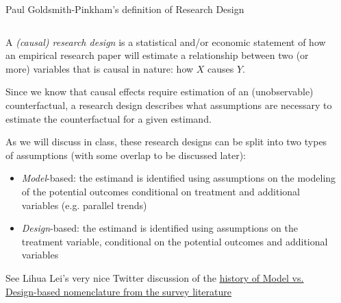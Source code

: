 \documentclass[notes,11pt, aspectratio=169]{beamer}
\newenvironment{wideitemize}{\itemize\addtolength{\itemsep}{10pt}}{\enditemize}
\begin{document}
\begin{frame}{Paul Goldsmith-Pinkham's definition of Research Design}
\begin{columns}[T] %
  \begin{column}{\textwidth}
    \begin{wideitemize}
    \item A \emph{(causal) research design} is a statistical and/or economic
      statement of how an empirical research paper will estimate a
      relationship between two (or more) variables that is causal in nature: how $X$ causes $Y$.

    \item Since we know that causal effects require estimation of an
      (unobservable) counterfactual, a research design describes what
      assumptions are necessary to estimate the counterfactual for a
      given estimand.
      
    \item As we will discuss in class, these research designs can be
      split into two types of assumptions (with some overlap to be
      discussed later):
      \begin{itemize}
      \item \emph{Model}-based: the estimand is
        identified using assumptions on the modeling of the potential outcomes conditional on treatment and additional variables
         (e.g. parallel trends)
       \item\emph{Design}-based: the estimand is
         identified using assumptions on the treatment variable,
         conditional on the potential outcomes and additional
         variables
      \end{itemize}

    \item See Lihua Lei's very nice Twitter discussion of the
      \underline{\href{https://twitter.com/lihua_lei_stat/status/1479700463343714306?s=20&t=pKi-XTp3e89Rn8KV8b3KEA}{history
          of Model vs. Design-based nomenclature from the survey
          literature}}
    \end{wideitemize}
\end{column}%
\hfill%
\begin{column}{.6\textwidth}
\end{column}%
\end{columns}
\end{frame}
\end{document}
